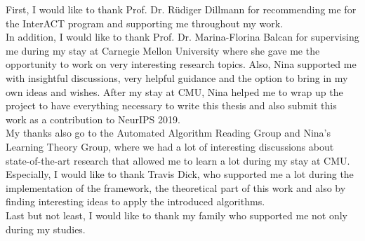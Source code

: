 \acks

First, I would like to thank Prof. Dr. Rüdiger Dillmann for recommending me for the InterACT program and supporting me throughout my work.\\

In addition, I would like to thank Prof. Dr. Marina-Florina Balcan for supervising me during my stay at Carnegie Mellon University where she gave me the opportunity to work on very interesting research topics. Also, Nina supported me with insightful discussions, very helpful guidance and the option to bring in my own ideas and wishes. After my stay at CMU, Nina helped me to wrap up the project to have everything necessary to write this thesis and also submit this work as a contribution to NeurIPS 2019.\\

My thanks also go to the Automated Algorithm Reading Group and Nina's Learning Theory Group, where we had a lot of interesting discussions about state-of-the-art research that allowed me to learn a lot during my stay at CMU. Especially, I would like to thank Travis Dick, who supported me a lot during the implementation of the framework, the theoretical part of this work and also by finding interesting ideas to apply the introduced algorithms.\\

Last but not least, I would like to thank my family who supported me not only during my studies.
